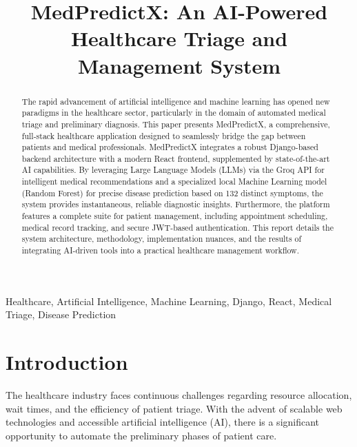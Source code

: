 \documentclass[conference]{IEEEtran}
\begin{document}
\title{MedPredictX: An AI-Powered Healthcare Triage and Management System\\
}

\author{
}

\maketitle

\begin{abstract}
The rapid advancement of artificial intelligence and machine learning has opened new paradigms in the healthcare sector, particularly in the domain of automated medical triage and preliminary diagnosis. This paper presents MedPredictX, a comprehensive, full-stack healthcare application designed to seamlessly bridge the gap between patients and medical professionals. MedPredictX integrates a robust Django-based backend architecture with a modern React frontend, supplemented by state-of-the-art AI capabilities. By leveraging Large Language Models (LLMs) via the Groq API for intelligent medical recommendations and a specialized local Machine Learning model (Random Forest) for precise disease prediction based on 132 distinct symptoms, the system provides instantaneous, reliable diagnostic insights. Furthermore, the platform features a complete suite for patient management, including appointment scheduling, medical record tracking, and secure JWT-based authentication. This report details the system architecture, methodology, implementation nuances, and the results of integrating AI-driven tools into a practical healthcare management workflow.
\end{abstract}

\begin{IEEEkeywords}
Healthcare, Artificial Intelligence, Machine Learning, Django, React, Medical Triage, Disease Prediction
\end{IEEEkeywords}

\section{Introduction}
The healthcare industry faces continuous challenges regarding resource allocation, wait times, and the efficiency of patient triage. With the advent of scalable web technologies and accessible artificial intelligence (AI), there is a significant opportunity to automate the preliminary phases of patient care. 
\end{document}
